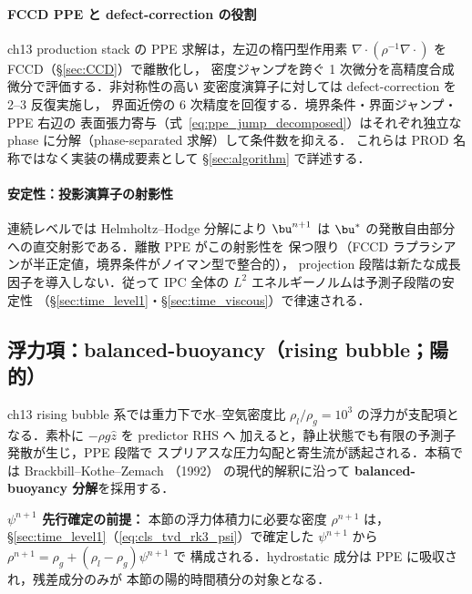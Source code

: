 \paragraph{FCCD PPE と defect-correction の役割}
ch13 production stack の PPE 求解は，左辺の楕円型作用素
$\nabla\!\cdot\!(\rho^{-1}\nabla\cdot)$ を FCCD（§\ref{sec:CCD}）で離散化し，
密度ジャンプを跨ぐ 1 次微分を高精度合成微分で評価する．非対称性の高い
変密度演算子に対しては defect-correction を 2--3 反復実施し，
界面近傍の 6 次精度を回復する．境界条件・界面ジャンプ・PPE 右辺の
表面張力寄与（式~\eqref{eq:ppe_jump_decomposed}）はそれぞれ独立な
phase に分解（phase-separated 求解）して条件数を抑える．
これらは PROD 名称ではなく実装の構成要素として §\ref{sec:algorithm}
で詳述する．

\paragraph{安定性：投影演算子の射影性}
連続レベルでは Helmholtz--Hodge 分解により $\bu^{n+1}$ は
$\bu^{*}$ の発散自由部分への直交射影である．離散 PPE がこの射影性を
保つ限り（FCCD ラプラシアンが半正定値，境界条件がノイマン型で整合的），
projection 段階は新たな成長因子を導入しない．従って IPC 全体の
$L^2$ エネルギーノルムは予測子段階の安定性
（§\ref{sec:time_level1}・§\ref{sec:time_viscous}）で律速される．

\subsection{浮力項：balanced-buoyancy（rising bubble；陽的）}
\label{sec:time_buoyancy}

ch13 rising bubble 系では重力下で水--空気密度比 $\rho_l/\rho_g = 10^3$
の浮力が支配項となる．素朴に $-\rho g \hat{z}$ を predictor RHS へ
加えると，静止状態でも有限の予測子発散が生じ，PPE 段階で
スプリアスな圧力勾配と寄生流が誘起される．本稿では Brackbill--Kothe--Zemach
（1992）\cite{Brackbill1992} の現代的解釈に沿って
\textbf{balanced-buoyancy 分解}を採用する．

\noindent\textbf{$\psi^{n+1}$ 先行確定の前提：}
本節の浮力体積力に必要な密度 $\rho^{n+1}$ は，
§\ref{sec:time_level1}（\eqref{eq:cls_tvd_rk3_psi}）で確定した
$\psi^{n+1}$ から $\rho^{n+1}=\rho_g+(\rho_l-\rho_g)\psi^{n+1}$ で
構成される．hydrostatic 成分は PPE に吸収され，残差成分のみが
本節の陽的時間積分の対象となる．

